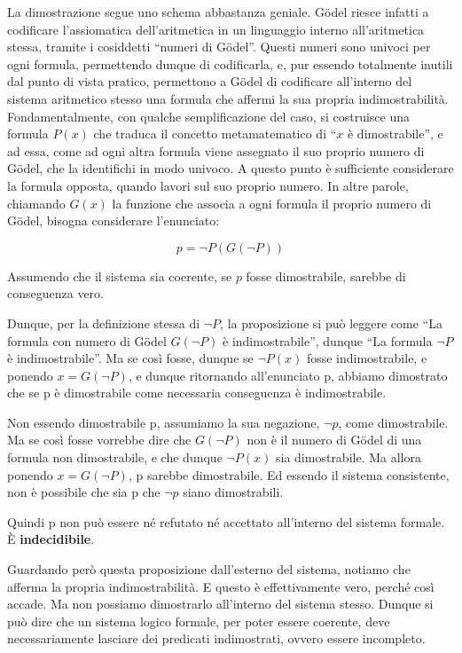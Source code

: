 \documentclass[a4paper,10pt]{article}
\begin{document}
La dimostrazione segue uno schema abbastanza geniale. Gödel riesce infatti a codificare l'assiomatica dell'aritmetica in un linguaggio interno all'aritmetica stessa, tramite i cosiddetti “numeri di Gödel”.
Questi numeri sono univoci per ogni formula, permettendo dunque di codificarla, e, pur essendo totalmente inutili dal punto di vista pratico, permettono a Gödel di codificare all'interno del sistema aritmetico stesso una formula che affermi la sua propria indimostrabilità.
Fondamentalmente, con qualche semplificazione del caso, si costruisce una formula $P(x)$ che traduca il concetto metamatematico di “$x$ è dimostrabile”, e ad essa, come ad ogni altra formula viene assegnato il suo proprio numero di Gödel, che la identifichi in modo univoco.
A questo punto è sufficiente considerare la formula opposta, quando lavori sul suo proprio numero.
In altre parole, chiamando $G(x)$ la funzione che associa a ogni formula il proprio numero di Gödel, bisogna considerare l'enunciato:

$$
p = \neg P(G(\neg P))
$$

Assumendo che il sistema sia coerente, se $p$ fosse dimostrabile, sarebbe di conseguenza vero. 

Dunque, per la definizione stessa di $\neg P$, la proposizione si può leggere come “La formula con numero di Gödel $G(\neg P)$ è indimostrabile”, dunque “La formula $\neg P$ è indimostrabile”. Ma se così fosse, dunque se $\neg P(x)$ fosse indimostrabile, e ponendo $x = G(\neg P)$, e dunque ritornando all'enunciato p, abbiamo dimostrato che se p è dimostrabile come necessaria conseguenza è indimostrabile.

Non essendo dimostrabile p, assumiamo la sua negazione, $\neg p$, come dimostrabile. Ma se così fosse vorrebbe dire che $G(\neg P)$ non è il numero di Gödel di una formula non dimostrabile, e che dunque $\neg P(x)$ sia dimostrabile. Ma allora ponendo $x = G(\neg P)$, p sarebbe dimostrabile. Ed essendo il sistema consistente, non è possibile che sia p che $\neg p$ siano dimostrabili.

Quindi p non può essere né refutato né accettato all'interno del sistema formale. È \textbf{indecidibile}.

Guardando però questa proposizione dall'esterno del sistema, notiamo che afferma la propria indimostrabilità. E questo è effettivamente vero, perché così accade. Ma non possiamo dimostrarlo all'interno del sistema stesso. Dunque si può dire che un sistema logico formale, per poter essere coerente, deve necessariamente lasciare dei predicati indimostrati, ovvero essere incompleto.
\end{document}
